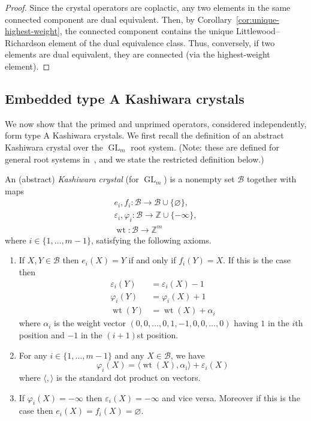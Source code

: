 \documentclass[ALCO,ThmDefs,Unicode,epreuves]{cedram}
\DeclareMathOperator{\wt}{wt}
\DeclareMathOperator{\GL}{GL}
\newcommand{\B}{\mathcal{B}}
\begin{document}
\begin{proof}
Since the crystal operators are coplactic, any two elements in the same connected component are dual equivalent. Then, by Corollary~\ref{cor:unique-highest-weight}, the connected component contains the unique Littlewood--Richardson element of the dual equivalence class. Thus, conversely, if two elements are dual equivalent, they are connected (via the highest-weight element).
\end{proof}

\subsection{Embedded type A Kashiwara crystals}

We now show that the primed and unprimed operators, considered independently, form type A Kashiwara crystals. We first recall the definition of an abstract Kashiwara crystal over the $\GL_m$ root system. (Note: these are defined for general root systems in~\cite{Kashiwara}, and we state the restricted definition below.)

\begin{defi}
An (abstract) \emph{Kashiwara crystal} (for $\GL _m$) is a nonempty set $\B$ together with maps 
\[
\begin{gathered}
e_i,f_i:\B\to \B\cup \{\varnothing\},
\\
\varepsilon_i,\varphi_i:\B\to \mathbb{Z}\cup \{-\infty\},
 \\
 \wt:\B\to \mathbb{Z}^m
\end{gathered}
\]
where $i\in \{1,\ldots,m-1\}$, satisfying the following axioms.
\begin{enumerate}[label = K\arabic*.,  ref=K\arabic*]
\item\label{defi6.7_K1} %
If $X,Y\in \B$ then $e_i(X)=Y$ if and only if $f_i(Y)=X$. If this is the case then
\begin{align*}
\varepsilon_i(Y)&=\varepsilon_i(X)-1 \\ \varphi_i(Y)&=\varphi_i(X)+1 \\
\wt (Y)&=\wt (X)+\alpha_i
\end{align*}
where $\alpha_i$ is the weight vector $(0,0,\ldots,0,1,-1,0,0,\ldots,0)$ having $1$ in the $i$th position and $-1$ in the $(i+1)$st position. 

\item\label{defi6.7_K2} %
For any $i\in \{1,\ldots,m-1\}$ and any $X\in \B$, we have 
\[
\varphi_i(X)=\langle \wt (X),\alpha_i\rangle+\varepsilon_i(X)
\]
 where $\langle,\rangle$ is the standard dot product on vectors.

\item\label{defi6.7_K3} %
If $\varphi_i(X)=-\infty$ then $\varepsilon_i(X)=-\infty$ and vice versa. Moreover if this is the case then $e_i(X)=f_i(X)=\varnothing$.
\end{enumerate}
\end{defi}
\end{document}
